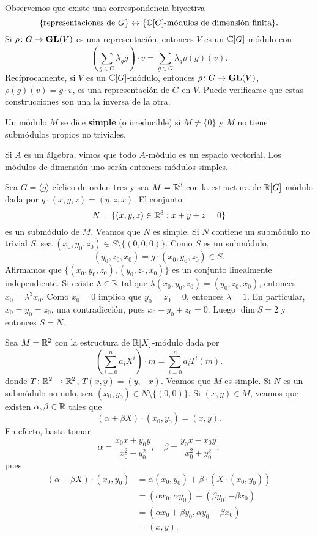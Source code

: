 Observemos que existe una correspondencia biyectiva 
\[
\{\text{representaciones de $G$}\}\leftrightarrow\{\text{$\mathbb{C}[G]$-módulos de dimensión finita}\}.
\]
Si $\rho\colon G\to\mathbf{GL}(V)$ es una representación, entonces 
$V$ es un $\mathbb{C}[G]$-módulo con
\[
\left(\sum_{g\in G}\lambda_gg\right)\cdot v=\sum_{g\in G}\lambda_g\rho(g)(v).
\]
Recíprocamente, si $V$ es un $\mathbb{C}[G]$-módulo, entonces $\rho\colon G\to\mathbf{GL}(V)$, 
$\rho(g)(v)=g\cdot v$, es una representación de $G$ en $V$. Puede verificarse que estas
construcciones son una la inversa de la otra.  

\begin{definition}
Un módulo $M$ se dice \textbf{simple} (o irreducible) si $M\ne\{0\}$ y $M$ no tiene
submódulos propios no triviales.  
\end{definition}

\begin{example}
Si $A$ es un álgebra, vimos que todo $A$-módulo es un espacio vectorial. Los módulos
de dimensión uno serán entonces módulos simples.
\end{example}

\begin{example}
Sea $G=\langle g\rangle$ cíclico de orden tres y sea $M=\mathbb{R}^3$ con la estructura de $\mathbb{R}[G]$-módulo 
dada por $g\cdot (x,y,z)=(y,z,x)$. El conjunto
\[
N=\{(x,y,z)\in\mathbb{R}^3:x+y+z=0\}
\]
es un submódulo de $M$. Veamos que $N$ es simple. Si $N$ contiene un submódulo no trivial $S$, 
sea $(x_0,y_0,z_0)\in S\setminus\{(0,0,0)\}$. Como $S$ es un submódulo, 
\[
(y_0,z_0,x_0)=g\cdot (x_0,y_0,z_0)\in S.
\]
Afirmamos
que $\{(x_0,y_0,z_0),(y_0,z_0,x_0)\}$ es un conjunto linealmente independiente. 	Si existe $\lambda\in\mathbb{R}$ 
tal que $\lambda(x_0,y_0,z_0)=(y_0,z_0,x_0)$, entonces $x_0=\lambda^3 x_0$. Como $x_0=0$ implica que 
$y_0=z_0=0$, entonces $\lambda=1$. En particular, $x_0=y_0=z_0$, una contradicción, pues $x_0+y_0+z_0=0$. 
Luego $\dim S=2$ y entonces
$S=N$. 
\end{example}

\begin{example}
Sea $M=\mathbb{R}^2$ con la estructura de $\mathbb{R}[X]$-módulo dada por
\[
\left(\sum_{i=0}^n a_iX^i\right)\cdot m=\sum_{i=0}^n a_iT^i(m).
\]
donde $T\colon\mathbb{R}^2\to\mathbb{R}^2$, $T(x,y)=(y,-x)$. 
Veamos que $M$ es simple. Si $N$ es un submódulo no nulo, sea $(x_0,y_0)\in N\setminus\{(0,0)\}$. Si $(x,y)\in M$, veamos que 
existen
$\alpha,\beta\in\mathbb{R}$ tales que
\[
(\alpha+\beta X)\cdot (x_0,y_0)=(x,y).
\]
En efecto, basta tomar 
\[
\alpha=\frac{x_0x+y_0y}{x_0^2+y_0^2},\quad
\beta=\frac{y_0x-x_0y}{x_0^2+y_0^2},
\]
pues
\begin{align*}
(\alpha+\beta X)\cdot (x_0,y_0)&=\alpha(x_0,y_0)+\beta\cdot (X\cdot (x_0,y_0))\\
&=(\alpha x_0,\alpha y_0)+(\beta y_0,-\beta x_0)\\
&=(\alpha x_0+\beta y_0,\alpha y_0-\beta x_0)\\
&=(x,y).	
\end{align*}
\end{example}

